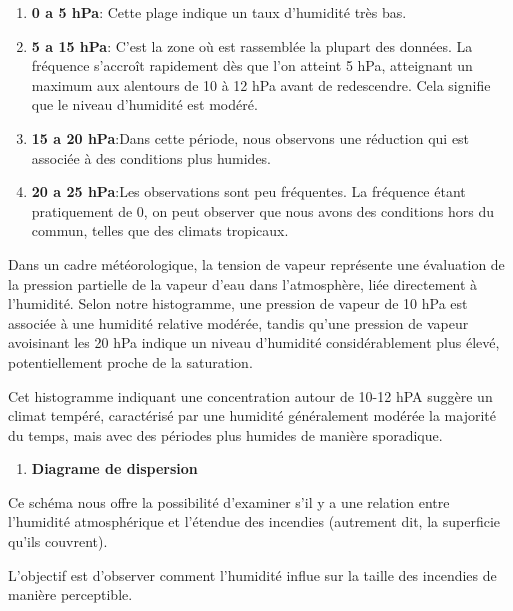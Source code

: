 \documentclass[
]{article}
\providecommand{\tightlist}{%
  \setlength{\itemsep}{0pt}\setlength{\parskip}{0pt}}
\begin{document}
\begin{enumerate}
\def\labelenumi{\arabic{enumi}.}
\tightlist
\item
  \textbf{0 a 5 hPa}: Cette plage indique un taux d'humidité très bas.
\item
  \textbf{5 a 15 hPa}: C'est la zone où est rassemblée la plupart des
  données. La fréquence s'accroît rapidement dès que l'on atteint 5 hPa,
  atteignant un maximum aux alentours de 10 à 12 hPa avant de
  redescendre. Cela signifie que le niveau d'humidité est modéré.
\item
  \textbf{15 a 20 hPa}:Dans cette période, nous observons une réduction
  qui est associée à des conditions plus humides.
\item
  \textbf{20 a 25 hPa}:Les observations sont peu fréquentes. La
  fréquence étant pratiquement de 0, on peut observer que nous avons des
  conditions hors du commun, telles que des climats tropicaux.
\end{enumerate}

Dans un cadre météorologique, la tension de vapeur représente une
évaluation de la pression partielle de la vapeur d'eau dans
l'atmosphère, liée directement à l'humidité. Selon notre histogramme,
une pression de vapeur de 10 hPa est associée à une humidité relative
modérée, tandis qu'une pression de vapeur avoisinant les 20 hPa indique
un niveau d'humidité considérablement plus élevé, potentiellement proche
de la saturation.

Cet histogramme indiquant une concentration autour de 10-12 hPA suggère
un climat tempéré, caractérisé par une humidité généralement modérée la
majorité du temps, mais avec des périodes plus humides de manière
sporadique.

\begin{enumerate}
\def\labelenumi{\arabic{enumi}.}
\setcounter{enumi}{1}
\tightlist
\item
  \textbf{Diagrame de dispersion}
\end{enumerate}

Ce schéma nous offre la possibilité d'examiner s'il y a une relation
entre l'humidité atmosphérique et l'étendue des incendies (autrement
dit, la superficie qu'ils couvrent).

L'objectif est d'observer comment l'humidité influe sur la taille des
incendies de manière perceptible.
\end{document}
